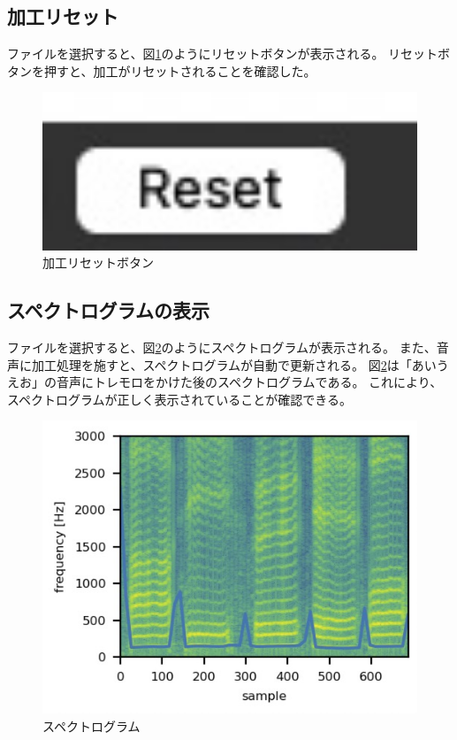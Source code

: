 \documentclass[a4paper,11pt]{jsarticle}
\begin{document}
\subsection{加工リセット}
ファイルを選択すると、図\ref{fig:reset}のようにリセットボタンが表示される。
リセットボタンを押すと、加工がリセットされることを確認した。

\begin{figure}[h]
\centering
\includegraphics[keepaspectratio, width=13cm]
{./images/reset_button.jpg}
\caption{加工リセットボタン}
\label{fig:reset}
\end{figure}


\subsection{スペクトログラムの表示}

ファイルを選択すると、図\ref{fig:spectrogram}のようにスペクトログラムが表示される。
また、音声に加工処理を施すと、スペクトログラムが自動で更新される。
図\ref{fig:spectrogram}は「あいうえお」の音声にトレモロをかけた後のスペクトログラムである。
これにより、スペクトログラムが正しく表示されていることが確認できる。

\begin{figure}[h]
\centering
\includegraphics[keepaspectratio, width=13cm]
{./images/spec-tremolo.jpg}
\caption{スペクトログラム}
\label{fig:spectrogram}
\end{figure}
\end{document}
